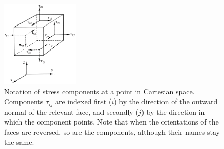\documentclass[a4paper,11pt]		{report}
\begin{document}
\begin{figure}
\begin{center}
\includegraphics[width=0.33\textwidth]{Fung-3.3.eps}
\end{center}
\caption{Notation of stress components at a point in Cartesian
  space. Components $\tau_{ij}$ are indexed first ($i$) by the
  direction of the outward normal of the relevant face, and secondly
  ($j$) by the direction in which the component points.  Note that
  when the orientations of the faces are reversed, so are the
  components, although their names stay the same.}
\label{fig.stress}
\end{figure}
\end{document}
